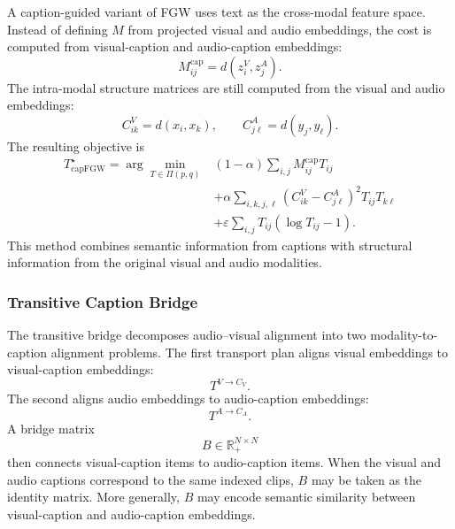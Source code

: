 A caption-guided variant of FGW uses text as the cross-modal feature space. Instead of defining $M$ from projected visual and audio embeddings, the cost is computed from visual-caption and audio-caption embeddings:
\begin{equation}
    M^{\mathrm{cap}}_{ij}
    =
    d(z_i^V,z_j^A).
\end{equation}
The intra-modal structure matrices are still computed from the visual and audio embeddings:
\begin{equation}
    C^V_{ik}=d(x_i,x_k),
    \qquad
    C^A_{j\ell}=d(y_j,y_\ell).
\end{equation}
The resulting objective is
\begin{equation}
\begin{split}
    T^{\star}_{\mathrm{capFGW}}
    =
    \arg\min_{T \in \Pi(p,q)}
    &
    (1-\alpha)
    \sum_{i,j} M^{\mathrm{cap}}_{ij}T_{ij}
    \\
    &
    +
    \alpha
    \sum_{i,k,j,\ell}
    \left(
    C^V_{ik} - C^A_{j\ell}
    \right)^2
    T_{ij}T_{k\ell}
    \\
    &
    +
    \varepsilon
    \sum_{i,j}
    T_{ij}
    \left(
    \log T_{ij} - 1
    \right).
\end{split}
\label{eq:caption_fgw}
\end{equation}
This method combines semantic information from captions with structural information from the original visual and audio modalities.

\subsubsection{Transitive Caption Bridge}
\label{subsubsec:transitive_bridge}

The transitive bridge decomposes audio--visual alignment into two modality-to-caption alignment problems. The first transport plan aligns visual embeddings to visual-caption embeddings:
\begin{equation}
    T^{V \rightarrow C_V}.
\end{equation}
The second aligns audio embeddings to audio-caption embeddings:
\begin{equation}
    T^{A \rightarrow C_A}.
\end{equation}
A bridge matrix
\begin{equation}
    B \in \mathbb{R}_{+}^{N \times N}
\end{equation}
then connects visual-caption items to audio-caption items. When the visual and audio captions correspond to the same indexed clips, $B$ may be taken as the identity matrix. More generally, $B$ may encode semantic similarity between visual-caption and audio-caption embeddings.

